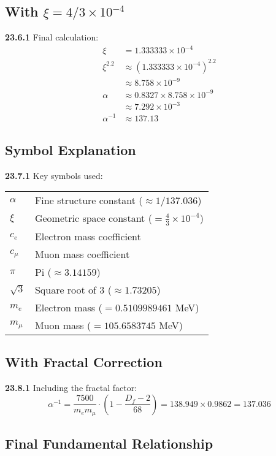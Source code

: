 \documentclass[12pt,a4paper]{article}
\begin{document}
\subsection{With $\xi = 4/3 \times 10^{-4}$}
\noindent \textbf{23.6.1} Final calculation:
\begin{align}
	\xi &= 1.333333 \times 10^{-4} \\
	\xi^{2.2} &\approx (1.333333 \times 10^{-4})^{2.2} \\
	&\approx 8.758 \times 10^{-9} \\
	\alpha &\approx 0.8327 \times 8.758 \times 10^{-9} \\
	&\approx 7.292 \times 10^{-3} \\
	\alpha^{-1} &\approx 137.13
\end{align}

\subsection{Symbol Explanation}

\noindent \textbf{23.7.1} Key symbols used:

\begin{tabular}{ll}
	$\alpha$ & Fine structure constant ($\approx 1/137.036$) \\
	$\xi$ & Geometric space constant ($= \frac{4}{3} \times 10^{-4}$) \\
	$c_e$ & Electron mass coefficient \\
	$c_\mu$ & Muon mass coefficient \\
	$\pi$ & Pi ($\approx 3.14159$) \\
	$\sqrt{3}$ & Square root of 3 ($\approx 1.73205$) \\
	$m_e$ & Electron mass ($= 0.5109989461$ MeV) \\
	$m_\mu$ & Muon mass ($= 105.6583745$ MeV) \\
\end{tabular}

\subsection{With Fractal Correction}

\noindent \textbf{23.8.1} Including the fractal factor:
\[
\alpha^{-1} = \frac{7500}{m_e m_\mu} \cdot \left(1 - \frac{D_f - 2}{68}\right) = 138.949 \times 0.9862 = 137.036
\]

\subsection{Final Fundamental Relationship}
\end{document}
